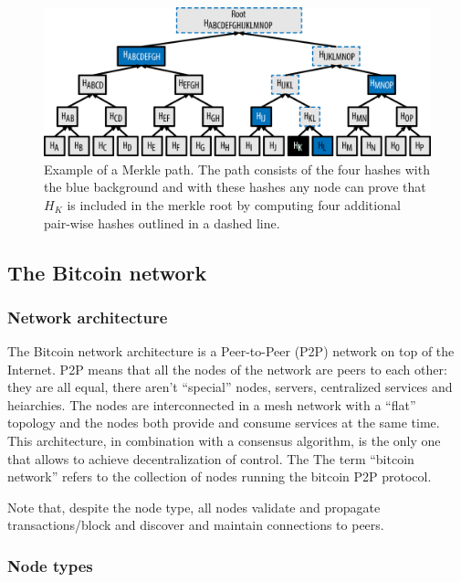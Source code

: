 \begin{figure}[!htb]
	\centering
	\includegraphics[width=1\linewidth]{img/merkle-tree-path.png}
	\caption{Example of a Merkle path. The path consists of the four hashes with the
  blue background and with these hashes any node can prove that $H_K$ is included
  in the merkle root by computing four additional pair-wise hashes outlined in a
  dashed line.  }
	\label{fig:merkle-tree-path}
\end{figure}








\subsection{The Bitcoin network}

\subsubsection{Network architecture} The Bitcoin network architecture is a
Peer-to-Peer (P2P) network on top of the Internet. P2P means that all the nodes
of the network are peers to each other: they are all equal, there aren't
``special'' nodes, servers, centralized services and heiarchies. The nodes are
interconnected in a mesh network with a ``flat'' topology and the nodes both
provide and consume services at the same time. This architecture, in combination
with a consensus algorithm, is the only one that allows to achieve
decentralization of control. The The term ``bitcoin network'' refers to the
collection of nodes running the bitcoin P2P protocol.

Note that, despite the node type, all nodes validate and propagate
transactions/block and discover and maintain connections to peers.

\subsubsection{Node types}

